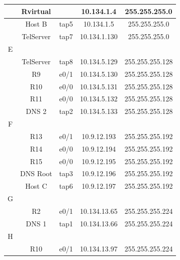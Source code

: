 \documentclass[12pt, a4paper, spanish]{article}
\begin{document}
\begin{center}
\begin{tabular}{|c|c|c|c|c|}
	\hline
	 & Rvirtual 		& 		& 10.134.1.4 	& 255.255.255.0 \\
	\hline
	 & Host B 		& tap5 	& 10.134.1.5 	& 255.255.255.0 \\
	\hline
	 & TelServer 	& tap7 	& 10.134.1.130 	& 255.255.255.0 \\
	\hline
	\hline
	E & & & & \\
	\hline
	 & TelServer 	& tap8 	& 10.134.5.129 	& 255.255.255.128 \\
	\hline
	 & R9 			& e0/1 	& 10.134.5.130 	& 255.255.255.128 \\
	\hline
	 & R10 			& e0/0 	& 10.134.5.131 	& 255.255.255.128 \\
	\hline
	 & R11 			& e0/0 	& 10.134.5.132 	& 255.255.255.128 \\
	\hline
	 & DNS 2 		& tap2 	& 10.134.5.133 	& 255.255.255.128 \\
	\hline
	\hline
	F & & & & \\
	\hline
	 & R13 			& e0/1 	& 10.9.12.193 	& 255.255.255.192 \\
	\hline
	 & R14 			& e0/0 	& 10.9.12.194 	& 255.255.255.192 \\
	\hline
	 & R15 			& e0/0 	& 10.9.12.195 	& 255.255.255.192 \\
	\hline
	 & DNS Root 		& tap3 	& 10.9.12.196 	& 255.255.255.192 \\
	\hline
	 & Host C 		& tap6 	& 10.9.12.197 	& 255.255.255.192 \\
	\hline
	\hline
	 G & & & & \\
	\hline
	 & R2 			& e0/1 	& 10.134.13.65 	& 255.255.255.224 \\
	\hline
	 & DNS 1 		& tap1 	& 10.134.13.66 	& 255.255.255.224 \\
	\hline
	\hline
	H & & & & \\
	\hline
	 & R10 			& e0/1 	& 10.134.13.97 	& 255.255.255.224 \\
	\hline
\end{tabular}
\end{center}
\end{document}
